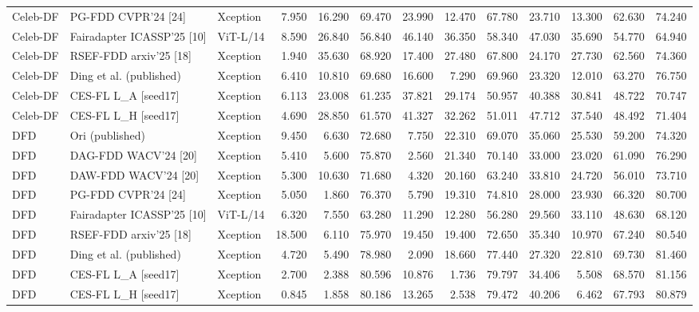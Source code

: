 \begin{table}[t]
{\begin{tabular}{lllrrrrrrrrrr}
Celeb-DF & PG-FDD CVPR’24 [24] & Xception & 7.950 & 16.290 & 69.470 & 23.990 & 12.470 & 67.780 & 23.710 & 13.300 & 62.630 & 74.240 \\
Celeb-DF & Fairadapter ICASSP’25 [10] & ViT-L/14 & 8.590 & 26.840 & 56.840 & 46.140 & 36.350 & 58.340 & 47.030 & 35.690 & 54.770 & 64.940 \\
Celeb-DF & RSEF-FDD arxiv’25 [18] & Xception & 1.940 & 35.630 & 68.920 & 17.400 & 27.480 & 67.800 & 24.170 & 27.730 & 62.560 & 74.360 \\
Celeb-DF & Ding et al. (published) & Xception & 6.410 & 10.810 & 69.680 & 16.600 & 7.290 & 69.960 & 23.320 & 12.010 & 63.270 & 76.750 \\
Celeb-DF & CES-FL L\_A [seed17] & Xception & 6.113 & 23.008 & 61.235 & 37.821 & 29.174 & 50.957 & 40.388 & 30.841 & 48.722 & 70.747 \\
Celeb-DF & CES-FL L\_H [seed17] & Xception & 4.690 & 28.850 & 61.570 & 41.327 & 32.262 & 51.011 & 47.712 & 37.540 & 48.492 & 71.404 \\
DFD & Ori (published) & Xception & 9.450 & 6.630 & 72.680 & 7.750 & 22.310 & 69.070 & 35.060 & 25.530 & 59.200 & 74.320 \\
DFD & DAG-FDD WACV’24 [20] & Xception & 5.410 & 5.600 & 75.870 & 2.560 & 21.340 & 70.140 & 33.000 & 23.020 & 61.090 & 76.290 \\
DFD & DAW-FDD WACV’24 [20] & Xception & 5.300 & 10.630 & 71.680 & 4.320 & 20.160 & 63.240 & 33.810 & 24.720 & 56.010 & 73.710 \\
DFD & PG-FDD CVPR’24 [24] & Xception & 5.050 & 1.860 & 76.370 & 5.790 & 19.310 & 74.810 & 28.000 & 23.930 & 66.320 & 80.700 \\
DFD & Fairadapter ICASSP’25 [10] & ViT-L/14 & 6.320 & 7.550 & 63.280 & 11.290 & 12.280 & 56.280 & 29.560 & 33.110 & 48.630 & 68.120 \\
DFD & RSEF-FDD arxiv’25 [18] & Xception & 18.500 & 6.110 & 75.970 & 19.450 & 19.400 & 72.650 & 35.340 & 10.970 & 67.240 & 80.540 \\
DFD & Ding et al. (published) & Xception & 4.720 & 5.490 & 78.980 & 2.090 & 18.660 & 77.440 & 27.320 & 22.810 & 69.730 & 81.460 \\
DFD & CES-FL L\_A [seed17] & Xception & 2.700 & 2.388 & 80.596 & 10.876 & 1.736 & 79.797 & 34.406 & 5.508 & 68.570 & 81.156 \\
DFD & CES-FL L\_H [seed17] & Xception & 0.845 & 1.858 & 80.186 & 13.265 & 2.538 & 79.472 & 40.206 & 6.462 & 67.793 & 80.879 \\
\bottomrule
\end{tabular}}
\end{table}

